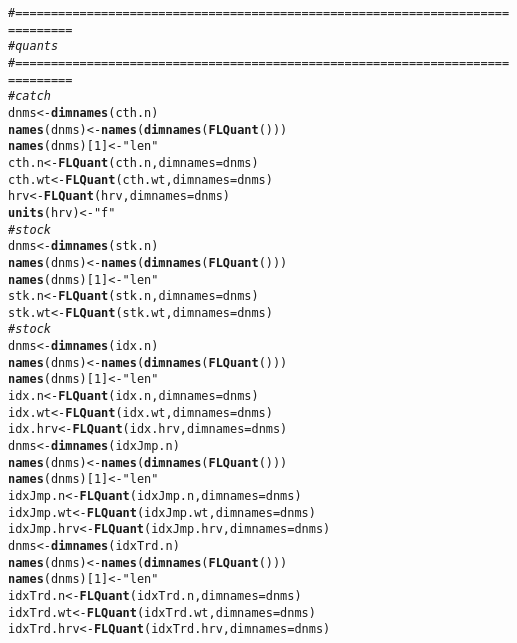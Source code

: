 \documentclass[a4paper,english,10pt]{article}\usepackage[]{graphicx}\usepackage[]{color}
\makeatletter
\newcommand{\hlnum}[1]{\textcolor[rgb]{0.686,0.059,0.569}{#1}}%
\newcommand{\hlstr}[1]{\textcolor[rgb]{0.192,0.494,0.8}{#1}}%
\newcommand{\hlcom}[1]{\textcolor[rgb]{0.678,0.584,0.686}{\textit{#1}}}%
\newcommand{\hlstd}[1]{\textcolor[rgb]{0.345,0.345,0.345}{#1}}%
\newcommand{\hlkwb}[1]{\textcolor[rgb]{0.69,0.353,0.396}{#1}}%
\newcommand{\hlkwc}[1]{\textcolor[rgb]{0.333,0.667,0.333}{#1}}%
\newcommand{\hlkwd}[1]{\textcolor[rgb]{0.737,0.353,0.396}{\textbf{#1}}}%
\newenvironment{kframe}{%
 \def\at@end@of@kframe{}%
 \ifinner\ifhmode%
  \def\at@end@of@kframe{\end{minipage}}%
  \begin{minipage}{\columnwidth}%
 \fi\fi%
 \def\FrameCommand##1{\hskip\@totalleftmargin \hskip-\fboxsep
 \colorbox{shadecolor}{##1}\hskip-\fboxsep
     \hskip-\linewidth \hskip-\@totalleftmargin \hskip\columnwidth}%
 \MakeFramed {\advance\hsize-\width
   \@totalleftmargin\z@ \linewidth\hsize
   \@setminipage}}%
 {\par\unskip\endMakeFramed%
 \at@end@of@kframe}
\newenvironment{knitrout}{}{} %
\makeatother
\begin{document}
\begin{knitrout}
\color{fgcolor}\begin{kframe}
\begin{alltt}
\hlcom{# ==============================================================================}
\hlcom{# quants}
\hlcom{# ==============================================================================}
\hlcom{# catch}
\hlstd{dnms} \hlkwb{<-} \hlkwd{dimnames}\hlstd{(cth.n)}
\hlkwd{names}\hlstd{(dnms)} \hlkwb{<-} \hlkwd{names}\hlstd{(}\hlkwd{dimnames}\hlstd{(}\hlkwd{FLQuant}\hlstd{()))}
\hlkwd{names}\hlstd{(dnms)[}\hlnum{1}\hlstd{]} \hlkwb{<-} \hlstr{"len"}
\hlstd{cth.n} \hlkwb{<-} \hlkwd{FLQuant}\hlstd{(cth.n,} \hlkwc{dimnames} \hlstd{= dnms)}
\hlstd{cth.wt} \hlkwb{<-} \hlkwd{FLQuant}\hlstd{(cth.wt,} \hlkwc{dimnames} \hlstd{= dnms)}
\hlstd{hrv} \hlkwb{<-} \hlkwd{FLQuant}\hlstd{(hrv,} \hlkwc{dimnames} \hlstd{= dnms)}
\hlkwd{units}\hlstd{(hrv)} \hlkwb{<-} \hlstr{"f"}
\hlcom{# stock}
\hlstd{dnms} \hlkwb{<-} \hlkwd{dimnames}\hlstd{(stk.n)}
\hlkwd{names}\hlstd{(dnms)} \hlkwb{<-} \hlkwd{names}\hlstd{(}\hlkwd{dimnames}\hlstd{(}\hlkwd{FLQuant}\hlstd{()))}
\hlkwd{names}\hlstd{(dnms)[}\hlnum{1}\hlstd{]} \hlkwb{<-} \hlstr{"len"}
\hlstd{stk.n} \hlkwb{<-} \hlkwd{FLQuant}\hlstd{(stk.n,} \hlkwc{dimnames} \hlstd{= dnms)}
\hlstd{stk.wt} \hlkwb{<-} \hlkwd{FLQuant}\hlstd{(stk.wt,} \hlkwc{dimnames} \hlstd{= dnms)}
\hlcom{# stock}
\hlstd{dnms} \hlkwb{<-} \hlkwd{dimnames}\hlstd{(idx.n)}
\hlkwd{names}\hlstd{(dnms)} \hlkwb{<-} \hlkwd{names}\hlstd{(}\hlkwd{dimnames}\hlstd{(}\hlkwd{FLQuant}\hlstd{()))}
\hlkwd{names}\hlstd{(dnms)[}\hlnum{1}\hlstd{]} \hlkwb{<-} \hlstr{"len"}
\hlstd{idx.n} \hlkwb{<-} \hlkwd{FLQuant}\hlstd{(idx.n,} \hlkwc{dimnames} \hlstd{= dnms)}
\hlstd{idx.wt} \hlkwb{<-} \hlkwd{FLQuant}\hlstd{(idx.wt,} \hlkwc{dimnames} \hlstd{= dnms)}
\hlstd{idx.hrv} \hlkwb{<-} \hlkwd{FLQuant}\hlstd{(idx.hrv,} \hlkwc{dimnames} \hlstd{= dnms)}
\hlstd{dnms} \hlkwb{<-} \hlkwd{dimnames}\hlstd{(idxJmp.n)}
\hlkwd{names}\hlstd{(dnms)} \hlkwb{<-} \hlkwd{names}\hlstd{(}\hlkwd{dimnames}\hlstd{(}\hlkwd{FLQuant}\hlstd{()))}
\hlkwd{names}\hlstd{(dnms)[}\hlnum{1}\hlstd{]} \hlkwb{<-} \hlstr{"len"}
\hlstd{idxJmp.n} \hlkwb{<-} \hlkwd{FLQuant}\hlstd{(idxJmp.n,} \hlkwc{dimnames} \hlstd{= dnms)}
\hlstd{idxJmp.wt} \hlkwb{<-} \hlkwd{FLQuant}\hlstd{(idxJmp.wt,} \hlkwc{dimnames} \hlstd{= dnms)}
\hlstd{idxJmp.hrv} \hlkwb{<-} \hlkwd{FLQuant}\hlstd{(idxJmp.hrv,} \hlkwc{dimnames} \hlstd{= dnms)}
\hlstd{dnms} \hlkwb{<-} \hlkwd{dimnames}\hlstd{(idxTrd.n)}
\hlkwd{names}\hlstd{(dnms)} \hlkwb{<-} \hlkwd{names}\hlstd{(}\hlkwd{dimnames}\hlstd{(}\hlkwd{FLQuant}\hlstd{()))}
\hlkwd{names}\hlstd{(dnms)[}\hlnum{1}\hlstd{]} \hlkwb{<-} \hlstr{"len"}
\hlstd{idxTrd.n} \hlkwb{<-} \hlkwd{FLQuant}\hlstd{(idxTrd.n,} \hlkwc{dimnames} \hlstd{= dnms)}
\hlstd{idxTrd.wt} \hlkwb{<-} \hlkwd{FLQuant}\hlstd{(idxTrd.wt,} \hlkwc{dimnames} \hlstd{= dnms)}
\hlstd{idxTrd.hrv} \hlkwb{<-} \hlkwd{FLQuant}\hlstd{(idxTrd.hrv,} \hlkwc{dimnames} \hlstd{= dnms)}
\end{alltt}
\end{kframe}
\end{knitrout}
\end{document}
